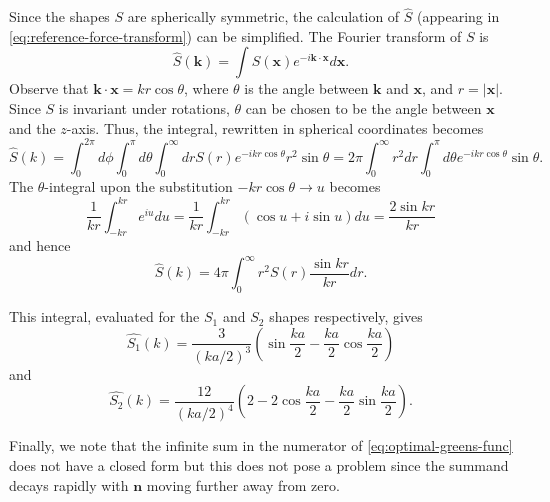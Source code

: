 Since the shapes $S$ are spherically symmetric, the calculation of $\hat{S}$ (appearing in \autoref{eq:reference-force-transform}) can be simplified.
The Fourier transform of $S$ is
\begin{equation*}
    \hat{S}(\mathbf{k}) = \int S(\mathbf{x}) e^{-i\mathbf{k} \cdot \mathbf{x}} d\mathbf{x}.
\end{equation*}
Observe that $\mathbf{k} \cdot \mathbf{x} = kr\cos\theta$, where $\theta$ is the angle between $\mathbf{k}$ and $\mathbf{x}$, and $r = |\mathbf{x}|$.
Since $S$ is invariant under rotations, $\theta$ can be chosen to be the angle between $\mathbf{x}$ and the $z$-axis.
Thus, the integral, rewritten in spherical coordinates becomes
\begin{equation*}
    \hat{S}(k) = \int_{0}^{2\pi}d\phi \int_{0}^{\pi} d\theta \int_{0}^{\infty}dr S(r)e^{-ikr\cos\theta}r^2\sin\theta
    = 2\pi \int_{0}^{\infty} r^2 dr \int_{0}^{\pi} d\theta e^{-ikr\cos\theta} \sin\theta.
\end{equation*}
The $\theta$-integral upon the substitution $-kr\cos\theta \to u$ becomes
\begin{equation*}
    \frac{1}{kr}\int_{-kr}^{kr} e^{iu} du
    = \frac{1}{kr} \int_{-kr}^{kr} (\cos u + i \sin u) du
    = \frac{2\sin kr}{kr}
\end{equation*}
and hence
\begin{equation*}
    \hat{S}(k) = 4\pi \int_{0}^{\infty} r^2 S(r)\frac{\sin kr}{kr}dr.
\end{equation*}

This integral, evaluated for the $S_1$ and $S_2$ shapes respectively, gives
\begin{equation*}
    \hat{S_1}(k) = \frac{3}{(ka/2)^3} \left(\sin\frac{ka}{2} - \frac{ka}{2} \cos\frac{ka}{2}\right)
\end{equation*}
and
\begin{equation*}
    \hat{S_2}(k) = \frac{12}{(ka/2)^4}\left(2 - 2\cos\frac{ka}{2}-\frac{ka}{2}\sin\frac{ka}{2}\right).
\end{equation*}

Finally, we note that the infinite sum in the numerator of \autoref{eq:optimal-greens-func} does not have a closed form but this does not pose a problem since the summand decays rapidly with $\mathbf{n}$ moving further away from zero.

